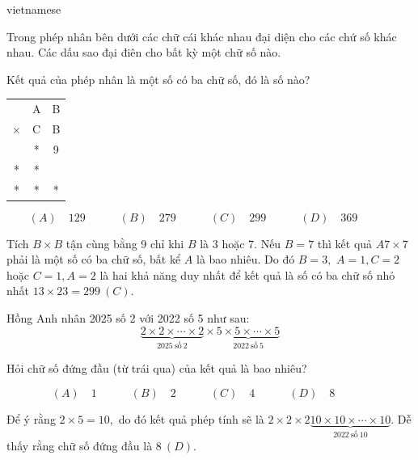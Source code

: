 \documentclass{article}
\begin{document}
\begin{otherlanguage*}{vietnamese}
\bigbreak

\begin{problem*}[PI-2024-C-P25]
    \label{problem:pi-2024-c-p25}

    Trong phép nhân bên dưới các chữ cái khác nhau đại diện cho các chứ số khác nhau.
    Các dấu sao đại điên cho bất kỳ một chữ số nào.

    Kết quả của phép nhân là một số có ba chữ số, đó là số nào?

    \begin{center}
        \begin{tabular}{ccc}
                 & A & B \\
        $\times$ & C & B \\ \hline
                 & * & 9 \\
        *        & * &   \\ \hline
        *        & * & *
        \end{tabular}
    \end{center}    

    \[
        (A) \quad 129 \qquad \quad
        (B) \quad 279 \qquad \quad
        (C) \quad 299 \qquad \quad
        (D) \quad 369 \qquad \quad
    \]
\end{problem*}

\begin{soln}
    Tích $B \times B$ tận cùng bằng 9 chỉ khi $B$ là 3 hoặc 7.
    Nếu $B=7$ thì kết quả $A7 \times 7$ phải là một số có ba chữ số, bất kể $A$ là bao nhiêu.
    Do đó $B=3,$ $A=1, C=2$ hoặc $C=1, A=2$ là hai khả năng duy nhất để kết quả là số có ba chữ số nhỏ nhất $13 \times 23 = \boxed{299\ (C).}$
\end{soln}

\bigbreak

\begin{problem*}[PI-2024-C-P26]
    \label{problem:pi-2024-c-p26}

    Hồng Anh nhân 2025 số 2 với 2022 số 5 như sau:
    \[
        \underbrace{2 \times 2 \times \cdots \times 2}_{2025\ \text{số}\ 2} \times \underbrace{5 \times 5 \times \cdots \times 5}_{2022\ \text{số}\ 5}
    \]

    Hỏi chữ số đứng đầu (từ trái qua) của kết quả là bao nhiêu?

    \[
        (A) \quad 1 \qquad \quad
        (B) \quad 2 \qquad \quad
        (C) \quad 4 \qquad \quad
        (D) \quad 8 \qquad \quad
    \]
\end{problem*}

\begin{soln}
    Để ý rằng $2 \times 5 = 10,$ do đó kết quả phép tính sẽ là $2 \times 2 \times 2 \underbrace{10 \times 10 \times \cdots \times 10}_{2022\ \text{số}\ 10}.$
    Dễ thấy rằng chữ số đứng đầu là $\boxed{8\ (D).}$
\end{soln}


\end{otherlanguage*}
\end{document}
